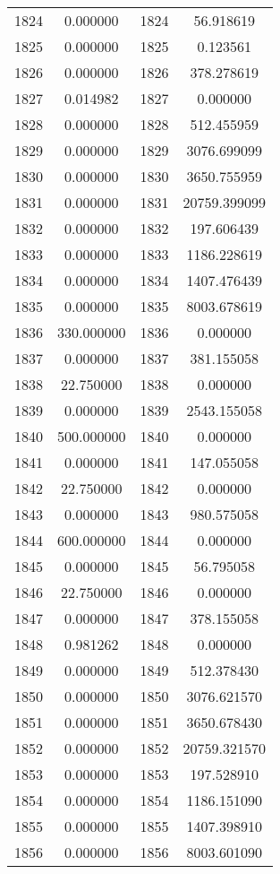 \documentclass[12pt]{article}
\begin{document}
\begin{longtable}{@{}cccc@{}}
1824 & 0.000000 & 1824 & 56.918619 \\
1825 & 0.000000 & 1825 & 0.123561 \\
1826 & 0.000000 & 1826 & 378.278619 \\
1827 & 0.014982 & 1827 & 0.000000 \\
1828 & 0.000000 & 1828 & 512.455959 \\
1829 & 0.000000 & 1829 & 3076.699099 \\
1830 & 0.000000 & 1830 & 3650.755959 \\
1831 & 0.000000 & 1831 & 20759.399099 \\
1832 & 0.000000 & 1832 & 197.606439 \\
1833 & 0.000000 & 1833 & 1186.228619 \\
1834 & 0.000000 & 1834 & 1407.476439 \\
1835 & 0.000000 & 1835 & 8003.678619 \\
1836 & 330.000000 & 1836 & 0.000000 \\
1837 & 0.000000 & 1837 & 381.155058 \\
1838 & 22.750000 & 1838 & 0.000000 \\
1839 & 0.000000 & 1839 & 2543.155058 \\
1840 & 500.000000 & 1840 & 0.000000 \\
1841 & 0.000000 & 1841 & 147.055058 \\
1842 & 22.750000 & 1842 & 0.000000 \\
1843 & 0.000000 & 1843 & 980.575058 \\
1844 & 600.000000 & 1844 & 0.000000 \\
1845 & 0.000000 & 1845 & 56.795058 \\
1846 & 22.750000 & 1846 & 0.000000 \\
1847 & 0.000000 & 1847 & 378.155058 \\
1848 & 0.981262 & 1848 & 0.000000 \\
1849 & 0.000000 & 1849 & 512.378430 \\
1850 & 0.000000 & 1850 & 3076.621570 \\
1851 & 0.000000 & 1851 & 3650.678430 \\
1852 & 0.000000 & 1852 & 20759.321570 \\
1853 & 0.000000 & 1853 & 197.528910 \\
1854 & 0.000000 & 1854 & 1186.151090 \\
1855 & 0.000000 & 1855 & 1407.398910 \\
1856 & 0.000000 & 1856 & 8003.601090 \\

\end{longtable}
\end{document}
